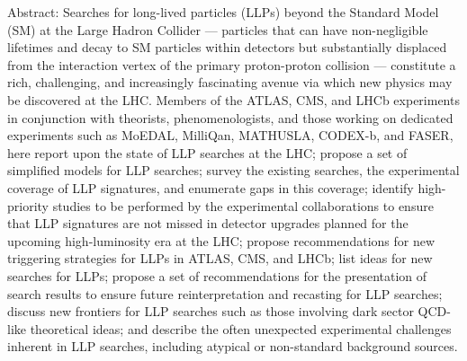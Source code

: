 Abstract: Searches for long-lived particles (LLPs) beyond the Standard Model (SM) at the Large Hadron Collider --- particles that can have non-negligible lifetimes and decay to SM particles within detectors but substantially displaced from the interaction vertex of the primary proton-proton collision --- constitute a rich, challenging, and increasingly fascinating avenue via which new physics may be discovered at the LHC.
Members of the ATLAS, CMS, and LHCb experiments in conjunction with theorists, phenomenologists, and those working on dedicated experiments such as MoEDAL, MilliQan, MATHUSLA, CODEX-b, and FASER, here report upon the state of LLP searches at the LHC; propose a set of simplified models for LLP searches; survey the existing searches, the experimental coverage of LLP signatures, and enumerate gaps in this coverage; identify high-priority studies to be performed by the experimental collaborations to ensure that LLP signatures are not missed in detector upgrades planned for the upcoming high-luminosity era at the LHC; propose recommendations for new triggering strategies for LLPs in ATLAS, CMS, and LHCb; list ideas for new searches for LLPs; propose a set of recommendations for the presentation of search results to ensure future reinterpretation and recasting for LLP searches; discuss new frontiers for LLP searches such as those involving dark sector QCD-like theoretical ideas; and describe the often unexpected experimental challenges inherent in LLP searches, including atypical or non-standard background sources.
